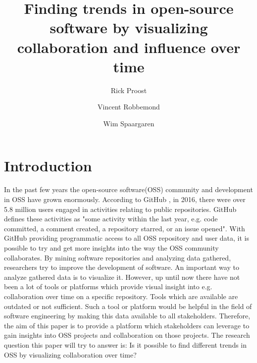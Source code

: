 \documentclass[acmtog, authorversion]{acmart}
\begin{document}
\title{Finding trends in open-source software by visualizing collaboration and influence over time} 

\author{Rick Proost}

\author{Vincent Robbemond}

\author{Wim Spaargaren}

\maketitle

\begin{abstract}
	
\end{abstract}

\section{Introduction}
In the past few years the open-source software(OSS) community and development in OSS have grown enormously.
According to GitHub \cite{GHOctoverse}, in 2016, there were over 5.8 million users engaged in activities relating to public repositories.
GitHub defines these activities as "some activity within the last year, e.g. code committed, a comment created, a repository starred, or an issue opened".
With GitHub providing programmatic access to all OSS repository and user data, it is possible to try and get more insights into the way the OSS community collaborates.
By mining software repositories and analyzing data gathered, researchers try to improve the development of software.
An important way to analyze gathered data is to visualize it.
However, up until now there have not been a lot of tools or platforms which provide visual insight into e.g. collaboration over time on a specific repository.
Tools which are available are outdated or not sufficient.
Such a tool or platform would be helpful in the field of software engineering by making this data available to all stakeholders.
Therefore, the aim of this paper is to provide a platform which stakeholders can leverage to gain insights into OSS projects and collaboration on those projects.
The research question this paper will try to answer is: Is it possible to find different trends in OSS by visualizing collaboration over time?
\end{document}
